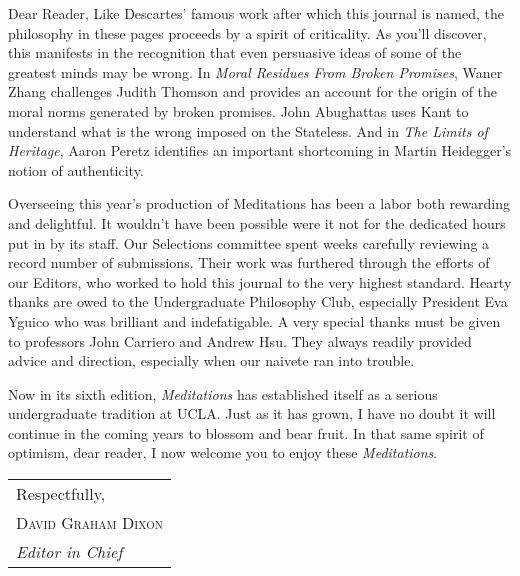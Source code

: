 \noindent Dear Reader,
\bigbreak
Like Descartes' famous work after which this journal is named, the philosophy in these pages proceeds by a spirit of criticality. As you'll discover, this manifests in the recognition that even persuasive ideas of some of the greatest minds may be wrong. In \emph{Moral Residues From Broken Promises}, Waner Zhang challenges Judith Thomson and provides an account for the origin of the moral norms generated by broken promises. John Abughattas uses Kant to understand what is the wrong imposed on the Stateless. And in \emph{The Limits of Heritage}, Aaron Peretz identifies an important shortcoming in Martin Heidegger's notion of authenticity.

Overseeing this year's production of Meditations has been a labor both rewarding and delightful. It wouldn't have been possible were it not for the dedicated hours put in by its staff. Our Selections committee spent weeks carefully reviewing a record number of submissions. Their work was furthered through the efforts of our Editors, who worked to hold this journal to the very highest standard. Hearty thanks are owed to the Undergraduate Philosophy Club, especially President Eva Yguico who was brilliant and indefatigable. A very special thanks must be given to professors John Carriero and Andrew Hsu. They always readily provided advice and direction, especially when our naivete ran into trouble.

Now in its sixth edition, \emph{Meditations} has established itself as a serious undergraduate tradition at UCLA. Just as it has grown, I have no doubt it will
continue in the coming years to blossom and bear fruit. In that same spirit of optimism, dear reader, I now welcome you to enjoy these \emph{Meditations}.
\bigbreak
\hfill
\begin{tabular}{@{}l@{}}
	Respectfully,	\\
	\scshape David Graham Dixon \\
	\textit{Editor in Chief}
\end{tabular}